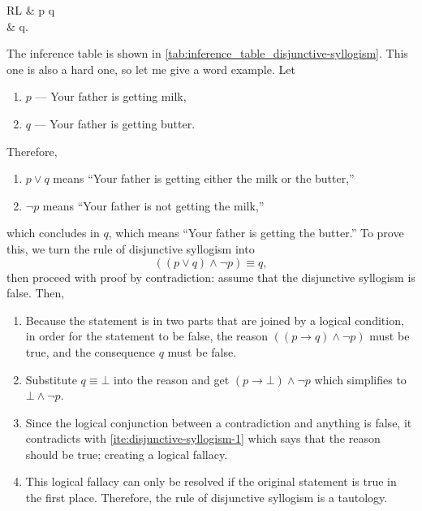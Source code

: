 \begin{table}[h]
  \centering
  \begin{tblr}{RL}
               & p \lor q \\

    \therefore & q.
  \end{tblr}
  \caption{Inference table for the disjunctive syllogism}
  \label{tab:inference_table_disjunctive-syllogism}
\end{table}
The inference table is shown in \cref{tab:inference_table_disjunctive-syllogism}. This one is also a hard one, so let me give a word example. Let
\begin{enumerate}[noitemsep]
  \item $p$ — Your father is getting milk,
  \item $q$ — Your father is getting butter.
\end{enumerate}
Therefore,
\begin{enumerate}[noitemsep]
  \item $p \lor q$ means \enquote{Your father is getting either the milk or the butter,}
  \item $\neg p$ means \enquote{Your father is not getting the milk,}
\end{enumerate}
which concludes in $q$, which means \enquote{Your father is getting the butter.} To prove this, we turn the rule of disjunctive syllogism into
\begin{equation}
  ((p \lor q) \land \neg p) \equiv q,
\end{equation}
then proceed with proof by contradiction: assume that the disjunctive syllogism is false. Then,
\begin{enumerate}[noitemsep]
  \item\label{ite:disjunctive-syllogism-1} Because the statement is in two parts that are joined by a logical condition, in order for the statement to be false, the reason $((p \to q) \land \neg p)$ must be true, and the consequence $q$ must be false.
  \item Substitute $q \equiv \bot$ into the reason and get $(p \to \bot) \land \neg p$ which simplifies to $\bot \land \neg p$.
  \item Since the logical conjunction between a contradiction and anything is false, it contradicts with \cref{ite:disjunctive-syllogism-1} which says that the reason should be true; creating a logical fallacy.
  \item This logical fallacy can only be resolved if the original statement is true in the first place. Therefore, the rule of disjunctive syllogism is a tautology.
\end{enumerate}

